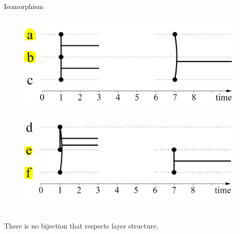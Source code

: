 \documentclass[15pt]{beamer}
\begin{document}
\begin{frame}{Isomorphism}
    \begin{minipage}{0.4\linewidth}
		\begin{figure}
			\centering
			\includegraphics[width=\linewidth]{img/iso1multi.jpg}
		\end{figure}
	\end{minipage}
	\begin{minipage}{0.4\linewidth}
		\begin{figure}
			\centering
			\includegraphics[width=\linewidth]{img/iso2multi.jpg}
		\end{figure}
	\end{minipage}
		\pause
	\\	
	There is no bijection that respects layer structure.
\end{frame}
\end{document}
